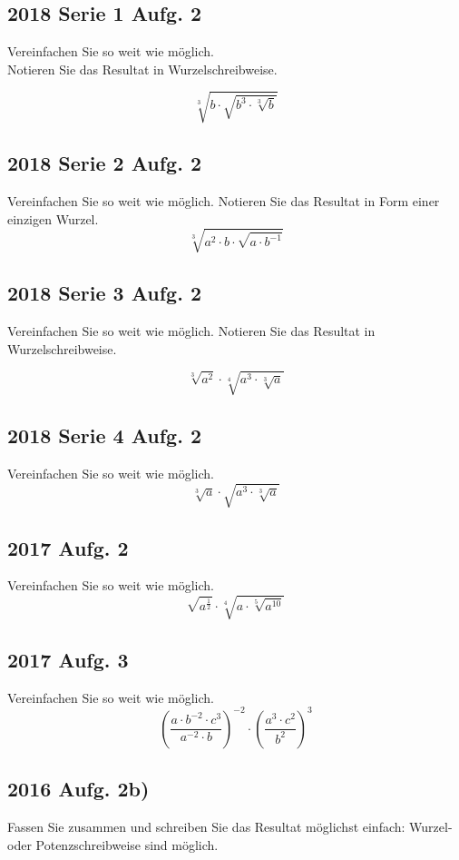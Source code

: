 \subsection{2018 Serie 1 Aufg. 2}
Vereinfachen Sie so weit wie möglich.\\
Notieren Sie das Resultat in Wurzelschreibweise.

$$\sqrt[3]{b\cdot{}\sqrt{b^3\cdot{}\sqrt[3]{b}}}$$


\subsection{2018 Serie 2 Aufg. 2}
Vereinfachen Sie so weit wie möglich.
Notieren Sie das Resultat in Form einer einzigen Wurzel.
$$\sqrt[3]{a^2 \cdot{} b \cdot{} \sqrt{a\cdot{}b^{-1}}}$$

\subsection{2018 Serie 3 Aufg. 2}

Vereinfachen Sie so weit wie möglich. Notieren Sie das Resultat in
Wurzelschreibweise.

$$\sqrt[3]{a^2}   \cdot{}    \sqrt[4]{a^3 \cdot{} \sqrt[3]{a}}$$

\subsection{2018 Serie 4 Aufg. 2}
Vereinfachen Sie so weit wie möglich.
$$\sqrt[3]{a} \cdot{} \sqrt{a^3\cdot{} \sqrt[3]{a} }$$

\subsection{2017 Aufg. 2}
Vereinfachen Sie so weit wie möglich.
$$\sqrt{a^{\frac{1}{2}}} \cdot{} \sqrt[4]{a\cdot{}\sqrt[5]{a^{10}}} $$


\subsection{2017 Aufg. 3}
Vereinfachen Sie so weit wie möglich.
$$\left( \frac{a\cdot{}b^{-2}\cdot{}c^3}{a^{-2}\cdot{}b}\right)^{-2}
\cdot{} \left( \frac{a^3 \cdot{} c^2}{b^2}\right)^3$$

\subsection{2016 Aufg. 2b)}

Fassen Sie zusammen und schreiben Sie das Resultat möglichst einfach:
Wurzel- oder Potenzschreibweise sind möglich.


